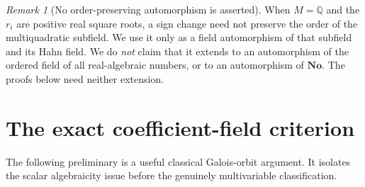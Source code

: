 \documentclass[11pt,a4paper]{article}
\numberwithin{equation}{section}
\theoremstyle{definition}
\theoremstyle{remark}
\newtheorem{remark}[theorem]{Remark}
\newcommand{\No}{\mathbf{No}}
\newcommand{\Q}{\mathbb Q}
\begin{document}
\begin{remark}[No order-preserving automorphism is asserted]\label{tail:rem:noorder}
When $M=\Q$ and the $r_i$ are positive real square roots, a sign change
need not preserve the order of the multiquadratic subfield. We use it
only as a field automorphism of that subfield and its Hahn field. We do
\emph{not} claim that it extends to an automorphism of the ordered field
of all real-algebraic numbers, or to an automorphism of $\No$. The proofs
below need neither extension.
\end{remark}

\section{The exact coefficient-field criterion}\label{tail:sec:coefficient}

The following preliminary is a useful classical Galois-orbit argument. It
isolates the scalar algebraicity issue before the genuinely multivariable
classification.
\end{document}
